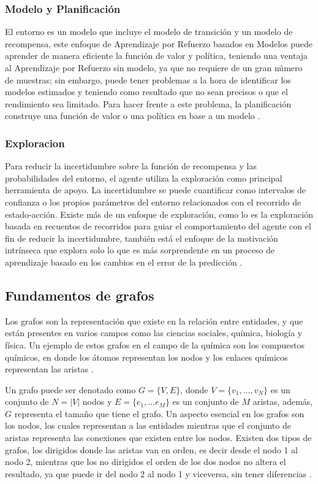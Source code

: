 \subsubsection{Modelo y Planificación}
El entorno es un modelo que incluye el modelo de transición y un modelo de recompensa, este enfoque de Aprendizaje por Refuerzo basados en Modelos puede aprender de manera eficiente la función de valor y política, teniendo una ventaja al Aprendizaje por Refuerzo sin modelo, ya que no requiere de un gran número de muestras; sin embargo, puede tener problemas a la hora de identificar los modelos estimados y teniendo como resultado que no sean precisos o que el rendimiento sea limitado. Para hacer frente a este problema, la planificación construye una función de valor o una política en base a un modelo \parencite{pr_artiDeep}.

\subsubsection{Exploracion}
Para reducir la incertidumbre sobre la función de recompensa y las probabilidades del entorno, el agente utiliza la exploración como principal herramienta de apoyo. La incertidumbre se puede cuantificar como intervalos de confianza o los propios parámetros del entorno relacionados con el recorrido de estado-acción. Existe más de un enfoque de exploración, como lo es la exploración basada en recuentos de recorridos para guiar el comportamiento del agente con el fin de reducir la incertidumbre, también está el enfoque de la motivación intrínseca que explora solo lo que es más sorprendente en un proceso de aprendizaje basado en los cambios en el error de la predicción \parencite{pr_artiDeep}.

\subsection{Fundamentos de grafos}
Los grafos son la representación que existe en la relación entre entidades, y que están presentes en varios campos como las ciencias sociales, química, biología y física. Un ejemplo de estos grafos en el campo de la química son los compuestos químicos, en donde los átomos representan los nodos y los enlaces químicos representan las aristas \parencite{bk_grafo}.

Un grafo puede ser denotado como $G = \{V, E\}$, donde $V = \{v_{1}, . . ., v_{N}\}$ es un conjunto de $N = |V|$ nodos y $E = \{e_{1}, . . . e_{M}\}$ es un conjunto de $M$ aristas, además, $G$ representa el tamaño que tiene el grafo. Un aspecto esencial en los grafos son los nodos, los cuales representan a las entidades mientras que el conjunto de aristas representa las conexiones que existen entre los nodos. Existen dos tipos de grafos, los dirigidos donde las aristas van en orden, es decir desde el nodo 1 al nodo 2, mientras que los no dirigidos el orden de los dos nodos no altera el resultado, ya que puede ir del nodo 2 al nodo 1 y viceversa, sin tener diferencias \parencite{bk_grafo}.

